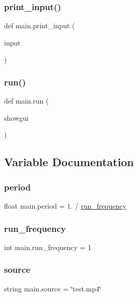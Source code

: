\mbox{\label{namespacemain_a0fe3fdb168f80f23bd787b6a6645d063}} 
\subsubsection{\texorpdfstring{print\+\_\+input()}{print\_input()}}
{\footnotesize\ttfamily def main.\+print\+\_\+input (\begin{DoxyParamCaption}\item[{}]{input }\end{DoxyParamCaption})}

\mbox{\label{namespacemain_a1fa92828a6a055fa38390012ffdd2b87}} 
\subsubsection{\texorpdfstring{run()}{run()}}
{\footnotesize\ttfamily def main.\+run (\begin{DoxyParamCaption}\item[{}]{showgui }\end{DoxyParamCaption})}



\subsection{Variable Documentation}
\mbox{\label{namespacemain_a9ec7279618de6ff9195552f460584339}} 
\subsubsection{\texorpdfstring{period}{period}}
{\footnotesize\ttfamily float main.\+period = 1. / \hyperlink{namespacemain_a57172d55d7c1b86fc48bcbc6c3783efb}{run\+\_\+frequency}}

\mbox{\label{namespacemain_a57172d55d7c1b86fc48bcbc6c3783efb}} 
\subsubsection{\texorpdfstring{run\+\_\+frequency}{run\_frequency}}
{\footnotesize\ttfamily int main.\+run\+\_\+frequency = 1}

\mbox{\label{namespacemain_a75667a1170a74674aa6f7fa04dca3f51}} 
\subsubsection{\texorpdfstring{source}{source}}
{\footnotesize\ttfamily string main.\+source = \char`\"{}test.\+mp4\char`\"{}}

